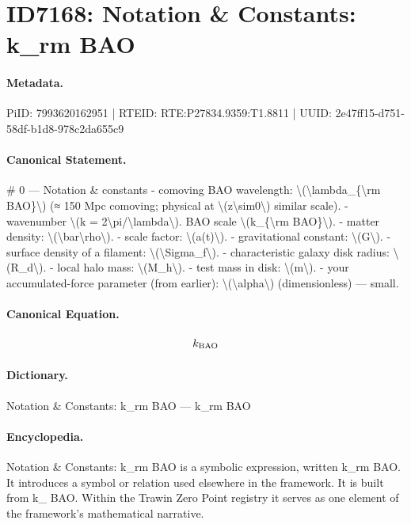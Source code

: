 \section*{ID7168: Notation \& Constants: k\_rm BAO}
\paragraph{Metadata.}
PiID: 7993620162951 | RTEID: RTE:P27834.9359:T1.8811 | UUID: 2e47ff15-d751-58df-b1d8-978c2da655c9

\paragraph{Canonical Statement.}
\# 0 — Notation \& constants - comoving BAO wavelength: \textbackslash{}(\textbackslash{}lambda\_\{\textbackslash{}rm BAO\}\textbackslash{}) (≈ 150 Mpc comoving; physical at \textbackslash{}(z\textbackslash{}sim0\textbackslash{}) similar scale). - wavenumber \textbackslash{}(k = 2\textbackslash{}pi/\textbackslash{}lambda\textbackslash{}). BAO scale \textbackslash{}(k\_\{\textbackslash{}rm BAO\}\textbackslash{}). - matter density: \textbackslash{}(\textbackslash{}bar\textbackslash{}rho\textbackslash{}). - scale factor: \textbackslash{}(a(t)\textbackslash{}). - gravitational constant: \textbackslash{}(G\textbackslash{}). - surface density of a filament: \textbackslash{}(\textbackslash{}Sigma\_f\textbackslash{}). - characteristic galaxy disk radius: \textbackslash{}(R\_d\textbackslash{}). - local halo mass: \textbackslash{}(M\_h\textbackslash{}). - test mass in disk: \textbackslash{}(m\textbackslash{}). - your accumulated-force parameter (from earlier): \textbackslash{}(\textbackslash{}alpha\textbackslash{}) (dimensionless) — small.

\paragraph{Canonical Equation.}
\[
k_{\rm BAO}
\]

\paragraph{Dictionary.}
Notation \& Constants: k\_rm BAO — k\_rm BAO

\paragraph{Encyclopedia.}
Notation \& Constants: k\_rm BAO is a symbolic expression, written k\_rm BAO. It introduces a symbol or relation used elsewhere in the framework. It is built from k\_ BAO. Within the Trawin Zero Point registry it serves as one element of the framework's mathematical narrative.
